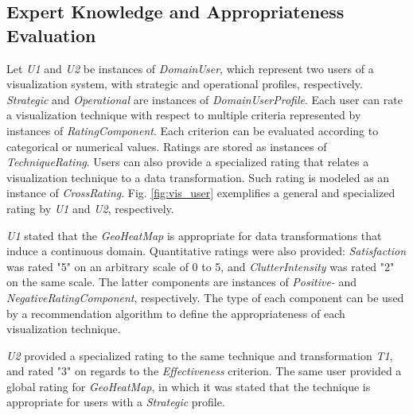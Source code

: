 \documentclass[]{interact}
\theoremstyle{plain}%
\theoremstyle{definition}
\theoremstyle{remark}
\theoremstyle{definition}
\begin{document}
\subsection{Expert Knowledge and Appropriateness Evaluation}

Let \textit{U1} and \textit{U2} be instances of \textit{DomainUser}, which represent two users of a visualization system, with strategic and operational profiles, respectively. \textit{Strategic} and \textit{Operational} are instances of \textit{DomainUserProfile}. Each user can rate a visualization technique with respect to multiple criteria represented by instances of \textit{RatingComponent}. Each criterion can be evaluated according to categorical or numerical values. Ratings are stored as instances of \textit{TechniqueRating}. Users can also provide a specialized rating that relates a visualization technique to a data transformation. Such rating is modeled as an instance of \textit{CrossRating}. Fig. \ref{fig:vis_user} exemplifies a general and specialized rating by \textit{U1} and \textit{U2}, respectively.

\textit{U1} stated that the \textit{GeoHeatMap} is appropriate for data transformations that induce a continuous domain. Quantitative ratings were also provided: \textit{Satisfaction} was rated "5" on an arbitrary scale of 0 to 5, and \textit{ClutterIntensity} was rated "2" on the same scale. The latter components are instances of \textit{Positive-} and \textit{NegativeRatingComponent}, respectively. The type of each component can be used by a recommendation algorithm to define the appropriateness of each visualization technique.

\textit{U2} provided a specialized rating to the same technique and transformation \textit{T1}, and rated "3" on regards to the \textit{Effectiveness} criterion. The same user provided a global rating for \textit{GeoHeatMap}, in which it was stated that the technique is appropriate for users with a \textit{Strategic} profile.

%
%
\end{document}
